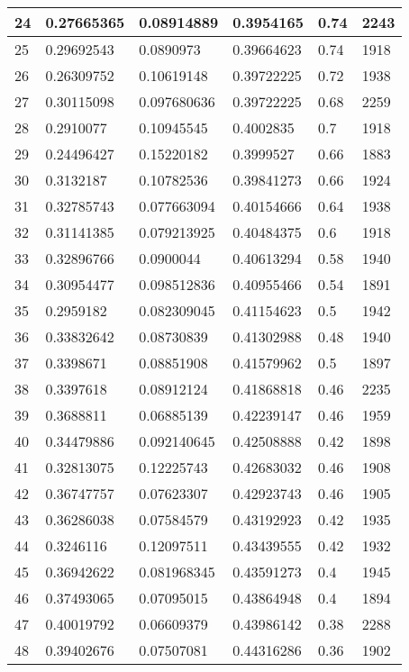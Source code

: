 \begin{longtable}{|l|l|l|l|l|l|}
24 & 0.27665365 & 0.08914889 & 0.3954165 & 0.74 & 2243 \\ \hline 
25 & 0.29692543 & 0.0890973 & 0.39664623 & 0.74 & 1918 \\ \hline 
26 & 0.26309752 & 0.10619148 & 0.39722225 & 0.72 & 1938 \\ \hline 
27 & 0.30115098 & 0.097680636 & 0.39722225 & 0.68 & 2259 \\ \hline 
28 & 0.2910077 & 0.10945545 & 0.4002835 & 0.7 & 1918 \\ \hline 
29 & 0.24496427 & 0.15220182 & 0.3999527 & 0.66 & 1883 \\ \hline 
30 & 0.3132187 & 0.10782536 & 0.39841273 & 0.66 & 1924 \\ \hline 
31 & 0.32785743 & 0.077663094 & 0.40154666 & 0.64 & 1938 \\ \hline 
32 & 0.31141385 & 0.079213925 & 0.40484375 & 0.6 & 1918 \\ \hline 
33 & 0.32896766 & 0.0900044 & 0.40613294 & 0.58 & 1940 \\ \hline 
34 & 0.30954477 & 0.098512836 & 0.40955466 & 0.54 & 1891 \\ \hline 
35 & 0.2959182 & 0.082309045 & 0.41154623 & 0.5 & 1942 \\ \hline 
36 & 0.33832642 & 0.08730839 & 0.41302988 & 0.48 & 1940 \\ \hline 
37 & 0.3398671 & 0.08851908 & 0.41579962 & 0.5 & 1897 \\ \hline 
38 & 0.3397618 & 0.08912124 & 0.41868818 & 0.46 & 2235 \\ \hline 
39 & 0.3688811 & 0.06885139 & 0.42239147 & 0.46 & 1959 \\ \hline 
40 & 0.34479886 & 0.092140645 & 0.42508888 & 0.42 & 1898 \\ \hline 
41 & 0.32813075 & 0.12225743 & 0.42683032 & 0.46 & 1908 \\ \hline 
42 & 0.36747757 & 0.07623307 & 0.42923743 & 0.46 & 1905 \\ \hline 
43 & 0.36286038 & 0.07584579 & 0.43192923 & 0.42 & 1935 \\ \hline 
44 & 0.3246116 & 0.12097511 & 0.43439555 & 0.42 & 1932 \\ \hline 
45 & 0.36942622 & 0.081968345 & 0.43591273 & 0.4 & 1945 \\ \hline 
46 & 0.37493065 & 0.07095015 & 0.43864948 & 0.4 & 1894 \\ \hline 
47 & 0.40019792 & 0.06609379 & 0.43986142 & 0.38 & 2288 \\ \hline 
48 & 0.39402676 & 0.07507081 & 0.44316286 & 0.36 & 1902 \\ \hline 

\end{longtable}
